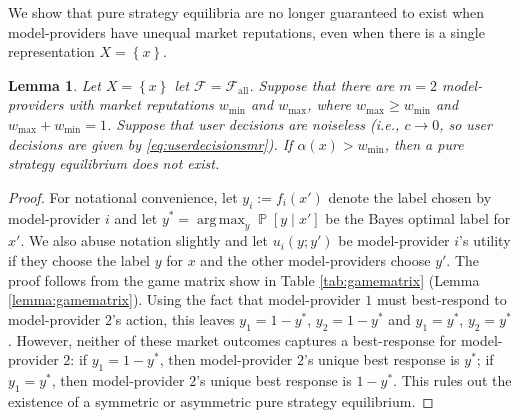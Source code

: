 \documentclass[letterpaper,11pt]{article}
\newtheorem{lemma}{Lemma}
\theoremstyle{plain}
\DeclareMathOperator*{\argmax}{arg\,max}
\DeclareMathOperator*{\Prob}{\mathbb{P}}
\begin{document}
We show that pure strategy equilibria are no longer guaranteed to exist when model-providers have unequal market reputations, even when there is a single representation $X = \left\{x \right\}$. 
\begin{lemma}
\label{lemma:nonexistence}
Let $X = \left\{x \right\}$ let $\mathcal{F} = \mathcal{F}_{\text{all}}$. Suppose that there are $m=2$ model-providers with market reputations $w_{\text{min}}$ and $w_{\text{max}}$, where $w_{\text{max}} \ge w_{\text{min}}$ and $w_{\text{max}} +  w_{\text{min}} = 1$. Suppose that user decisions are noiseless (i.e., $c \rightarrow 0$, so user decisions are given by \eqref{eq:userdecisionsmr}). If $\alpha(x) > w_{\text{min}}$, then a pure strategy equilibrium does not exist. 
\end{lemma}
\begin{proof}
For notational convenience, let $y_i := f_i(x')$ denote the label chosen by model-provider $i$ and 
let $y^* =  \argmax_{y} \Prob[y \mid x']$ be the Bayes optimal label for $x'$. We also abuse notation slightly and let $u_i(y; y')$ be model-provider $i$'s utility if they choose the label $y$ for $x$ and the other model-providers choose $y'$. The proof follows from the game matrix show in Table \ref{tab:gamematrix} (Lemma \ref{lemma:gamematrix}). Using the fact that model-provider $1$ must best-respond to model-provider $2$'s action, this leaves $y_1 = 1-y^*$, $y_2 = 1-y^*$ and $y_1 = y^*$, $y_2 = y^*$. However, neither of these market outcomes captures a best-response for model-provider $2$: if $y_1 = 1 - y^*$, then model-provider $2$'s unique best response is $y^*$; if $y_1 = y^*$, then model-provider $2$'s unique best response is $1-y^*$. This rules out the existence of a symmetric or asymmetric pure strategy equilibrium. 
\end{proof}
\end{document}
